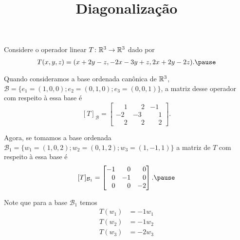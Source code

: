 \documentclass{beamer}
\title{Diagonalização}
\author[\autor]{\autor}
\institute[\instituto]{\instituto}
\date{}
\begin{document}
    \begin{frame}
        \maketitle
    \end{frame}


    \begin{frame}
        Considere o operador linear $T \colon \mathbb{R}^3 \to \mathbb{R}^3$ dado por
        \begin{align*}
            T(x, y, z) = (x + 2y - z, -2x -3y + z, 2x + 2y - 2z).\pause
        \end{align*}

        Quando consideramos a base ordenada canônica \pause de $\mathbb{R}^3$, \pause $\mathcal{B} = \{e_1 = (1, 0, 0); e_2 = (0, 1, 0); e_3 = (0, 0, 1)\}$, \pause a matriz desse operador com respeito à essa base é\pause
        \[
            [T]_\mathcal{B} = \begin{bmatrix}
                \phantom{-}1 & \phantom{-}2 & -1\\
                -2 & -3 & \phantom{-}1\\
                \phantom{-}2 & \phantom{-}2 & \phantom{-}2
            \end{bmatrix}.
        \]
    \end{frame}

    \begin{frame}
        Agora, se tomamos a base ordenada \pause $\mathcal{B}_1 = \{w_1 = (1, 0, 2); w_2 = (0, 1, 2); w_3 = (1, -1, 1)\}$ \pause a matriz de $T$ com respeito à essa base é\pause
        \[
            [T]_{\mathcal{B}_1} = \begin{bmatrix}
            -1 & \phantom{-}0 & \phantom{-}0\\
            \phantom{-}0& -1 & \phantom{-}0\\
            \phantom{-}0& \phantom{-}0 & -2
        \end{bmatrix}.\pause
        \]

        Note que para a base $\mathcal{B}_1$ temos \pause
        \begin{align*}
            T(w_1) &= -1w_1\\
            T(w_2) &= -1w_2\\
            T(w_3) &= -2w_3\\
        \end{align*}
    \end{frame}
\end{document}
